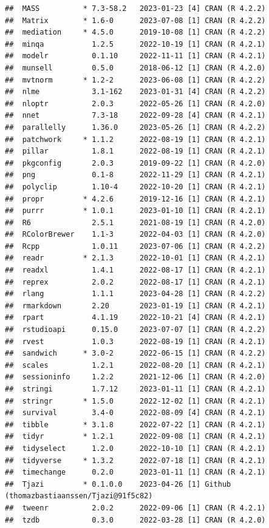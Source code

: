 \documentclass[
]{article}
\begin{document}
\begin{verbatim}
##  MASS          * 7.3-58.2   2023-01-23 [4] CRAN (R 4.2.2)
##  Matrix        * 1.6-0      2023-07-08 [1] CRAN (R 4.2.2)
##  mediation     * 4.5.0      2019-10-08 [1] CRAN (R 4.2.2)
##  minqa           1.2.5      2022-10-19 [1] CRAN (R 4.2.1)
##  modelr          0.1.10     2022-11-11 [1] CRAN (R 4.2.1)
##  munsell         0.5.0      2018-06-12 [1] CRAN (R 4.2.0)
##  mvtnorm       * 1.2-2      2023-06-08 [1] CRAN (R 4.2.2)
##  nlme            3.1-162    2023-01-31 [4] CRAN (R 4.2.2)
##  nloptr          2.0.3      2022-05-26 [1] CRAN (R 4.2.0)
##  nnet            7.3-18     2022-09-28 [4] CRAN (R 4.2.1)
##  parallelly      1.36.0     2023-05-26 [1] CRAN (R 4.2.2)
##  patchwork     * 1.1.2      2022-08-19 [1] CRAN (R 4.2.1)
##  pillar          1.8.1      2022-08-19 [1] CRAN (R 4.2.1)
##  pkgconfig       2.0.3      2019-09-22 [1] CRAN (R 4.2.0)
##  png             0.1-8      2022-11-29 [1] CRAN (R 4.2.1)
##  polyclip        1.10-4     2022-10-20 [1] CRAN (R 4.2.1)
##  propr         * 4.2.6      2019-12-16 [1] CRAN (R 4.2.1)
##  purrr         * 1.0.1      2023-01-10 [1] CRAN (R 4.2.1)
##  R6              2.5.1      2021-08-19 [1] CRAN (R 4.2.0)
##  RColorBrewer    1.1-3      2022-04-03 [1] CRAN (R 4.2.0)
##  Rcpp            1.0.11     2023-07-06 [1] CRAN (R 4.2.2)
##  readr         * 2.1.3      2022-10-01 [1] CRAN (R 4.2.1)
##  readxl          1.4.1      2022-08-17 [1] CRAN (R 4.2.1)
##  reprex          2.0.2      2022-08-17 [1] CRAN (R 4.2.1)
##  rlang           1.1.1      2023-04-28 [1] CRAN (R 4.2.2)
##  rmarkdown       2.20       2023-01-19 [1] CRAN (R 4.2.1)
##  rpart           4.1.19     2022-10-21 [4] CRAN (R 4.2.1)
##  rstudioapi      0.15.0     2023-07-07 [1] CRAN (R 4.2.2)
##  rvest           1.0.3      2022-08-19 [1] CRAN (R 4.2.1)
##  sandwich      * 3.0-2      2022-06-15 [1] CRAN (R 4.2.2)
##  scales          1.2.1      2022-08-20 [1] CRAN (R 4.2.1)
##  sessioninfo     1.2.2      2021-12-06 [1] CRAN (R 4.2.0)
##  stringi         1.7.12     2023-01-11 [1] CRAN (R 4.2.1)
##  stringr       * 1.5.0      2022-12-02 [1] CRAN (R 4.2.1)
##  survival        3.4-0      2022-08-09 [4] CRAN (R 4.2.1)
##  tibble        * 3.1.8      2022-07-22 [1] CRAN (R 4.2.1)
##  tidyr         * 1.2.1      2022-09-08 [1] CRAN (R 4.2.1)
##  tidyselect      1.2.0      2022-10-10 [1] CRAN (R 4.2.1)
##  tidyverse     * 1.3.2      2022-07-18 [1] CRAN (R 4.2.1)
##  timechange      0.2.0      2023-01-11 [1] CRAN (R 4.2.1)
##  Tjazi         * 0.1.0.0    2023-04-26 [1] Github (thomazbastiaanssen/Tjazi@91f5c82)
##  tweenr          2.0.2      2022-09-06 [1] CRAN (R 4.2.1)
##  tzdb            0.3.0      2022-03-28 [1] CRAN (R 4.2.0)

\end{verbatim}
\end{document}
